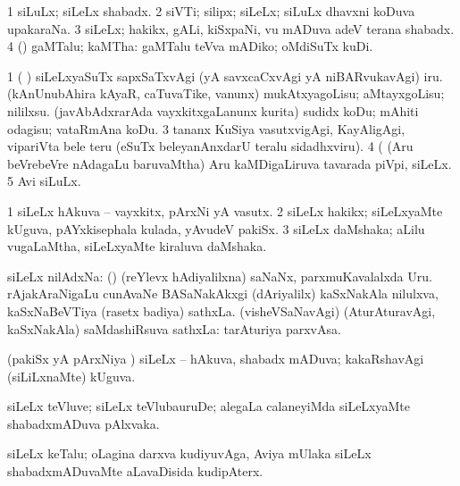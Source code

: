 \bentry
{}
\gl{\nA}
\expl{}
\bmng
\bnum
\num{1} siLuLx; siLeLx shabadx. 
\num{2} siVTi; silipx; siLeLx; siLuLx dhavxni koDuva upakaraNa. 
\num{3} siLeLx; hakikx, gALi, kiSxpaNi, \mo vu mADuva adeV terana shabadx. 
\num{4} (\AmA) gaMTalu; kaMTha:  gaMTalu teVva mADiko; oMdiSuTx kuDi. 
\enum
\emng

\noindent 
\gl{\pagu}
\bmng
\bnum
\num{1}  (   )  siLeLxyaSuTx sapxSaTxvAgi (yA savxcaCxvAgi yA niBARvukavAgi) iru. 
  
\banum
{} (kAnUnubAhira kAyaR, caTuvaTike, \mo vanunx) mukAtxyagoLisu; aMtayxgoLisu; nililxsu. 
 (javAbAdxrarAda vayxkitxgaLanunx kurita) sudidx koDu; mAhiti odagisu; vataRmAna koDu. 
\eanum
\numie
\num{3}  tananx KuSiya vasutxvigAgi, KayAligAgi, vipariVta bele teru (eSuTx beleyanAnxdarU teralu sidadhxviru). 
\num{4}  (  (Aru beVrebeVre nAdagaLu baruvaMtha) Aru kaMDigaLiruva tavarada piVpi, siLeLx. 
\num{5}  Avi siLuLx. 
\enum
\emng
\eentry

\bentry 
{}
\gl{\nA}
\bmng
\bnum
\num{1} siLeLx hAkuva -- vayxkitx, pArxNi yA vasutx. 
\num{2} siLeLx hakikx; siLeLxyaMte kUguva, pAYxkisephala kulada, yAvudeV pakiSx. 
\num{3} siLeLx daMshaka; aLilu \mo vugaLaMtha, siLeLxyaMte kiraluva daMshaka. 
\enum
\emng
\eentry

\bentry
{} 
\gl{\nA}
\expl{}
\bmng
siLeLx nilAdxNa: 
\banum
{} (\ame) (reYlevx hAdiyalilxna) saNaNx, parxmuKavalalxda Uru. 
 rAjakAraNigaLu cunAvaNe BASaNakAkxgi (dAriyalilx) kaSxNakAla nilulxva, kaSxNaBeVTiya (rasetx badiya) sathxLa. 
 (visheVSaNavAgi) (AturAturavAgi, kaSxNakAla) saMdashiRsuva sathxLa:  tarAturiya parxvAsa. 
\eanum
\emng
\eentry

\bentry
{} 
\gl{\gu}
\expl{}
\bmng
(pakiSx yA pArxNiya \vi) siLeLx -- hAkuva, shabadx mADuva; kakaRshavAgi (siLiLxnaMte) kUguva. 
\emng
\eentry

\bentry
{} 
\gl{\nA}
\expl{}
\bmng
siLeLx teVluve; siLeLx teVlubauruDe; alegaLa calaneyiMda siLeLxyaMte shabadxmADuva pAlxvaka. 
\emng
\eentry

\bentry
{}
\gl{\nA}
\bmng
siLeLx keTalu; oLagina darxva kudiyuvAga, Aviya mUlaka siLeLx shabadxmADuvaMte aLavaDisida kudipAterx. 
\emng
\eentry

